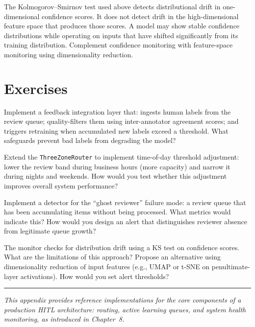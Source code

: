 \begin{cautionbox}
The Kolmogorov--Smirnov test used above detects distributional drift in one-dimensional confidence scores. It does not detect drift in the high-dimensional feature space that produces those scores. A model may show stable confidence distributions while operating on inputs that have shifted significantly from its training distribution. Complement confidence monitoring with feature-space monitoring using dimensionality reduction.
\end{cautionbox}

\section{Exercises}

\begin{Exercise}
Implement a feedback integration layer that: ingests human labels from the review queue; quality-filters them using inter-annotator agreement scores; and triggers retraining when accumulated new labels exceed a threshold. What safeguards prevent bad labels from degrading the model?
\end{Exercise}

\begin{Exercise}
Extend the \texttt{ThreeZoneRouter} to implement time-of-day threshold adjustment: lower the review band during business hours (more capacity) and narrow it during nights and weekends. How would you test whether this adjustment improves overall system performance?
\end{Exercise}

\begin{Exercise}
Implement a detector for the ``ghost reviewer'' failure mode: a review queue that has been accumulating items without being processed. What metrics would indicate this? How would you design an alert that distinguishes reviewer absence from legitimate queue growth?
\end{Exercise}

\begin{Exercise}
The monitor checks for distribution drift using a KS test on confidence scores. What are the limitations of this approach? Propose an alternative using dimensionality reduction of input features (e.g., UMAP or t-SNE on penultimate-layer activations). How would you set alert thresholds?
\end{Exercise}

\bigskip
\begin{center}
\rule{0.5\textwidth}{0.4pt}
\end{center}
\bigskip

\noindent\textit{This appendix provides reference implementations for the core components of a production HITL architecture: routing, active learning queues, and system health monitoring, as introduced in Chapter~8.}
\apxnumoff
